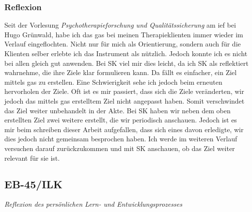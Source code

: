 \subsubsection{Reflexion}
Seit der Vorlesung \textit{Psychotherapieforschung und Qualitätssicherung} am \ac{ief} bei Hugo Grünwald, habe ich das \ac{gas} bei meinen Therapieklienten immer wieder im Verlauf eingeflochten. Nicht nur für mich als Orientierung, sondern auch für die Klienten selber erlebte ich das Instrument als nützlich. Jedoch konnte ich es nicht bei allen gleich gut anwenden. Bei SK viel mir dies leicht, da ich SK als reflektiert wahrnehme, die ihre Ziele klar formulieren kann. Da fällt es einfacher, ein Ziel mittels \ac{gas} zu erstellen. Eine Schwierigkeit sehe ich jedoch beim erneuten hervorholen der Ziele. Oft ist es mir passiert, dass sich die Ziele veränderten, wir jedoch das mittels \ac{gas} erstelltem Ziel nicht angepasst haben. Somit verschwindet das Ziel weiter unbehandelt in der Akte. Bei SK haben wir neben dem oben erstellten Ziel zwei weitere erstellt, die wir periodisch anschauen. Jedoch ist es mir beim schreiben dieser Arbeit aufgefallen, dass sich eines davon erledigte, wir dies jedoch nicht gemeinsam besprochen haben. Ich werde im weiteren Verlauf versuchen darauf zurückzukommen und mit SK anschauen, ob das Ziel weiter relevant für sie ist.

\subsection{EB-45/ILK}

\textit{Reflexion des persönlichen Lern- und Entwicklungsprozesses}
 